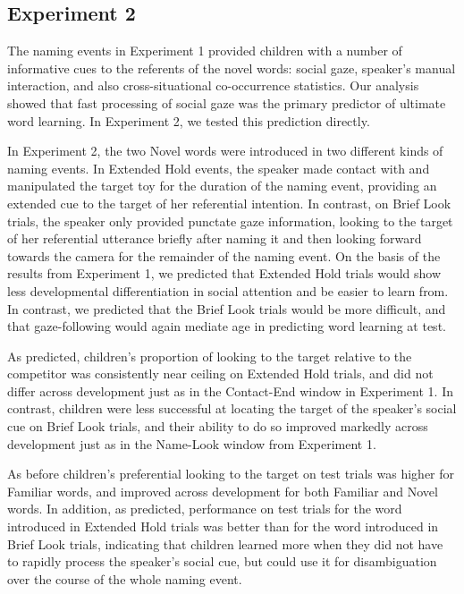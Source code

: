 \documentclass{pnastwo}
\begin{document}
\begin{article}
\section{Experiment 2}

The naming events in Experiment 1 provided children with a number of informative cues to the referents of the novel words: social gaze, speaker's manual interaction, and also cross-situational co-occurrence statistics. Our analysis showed that fast processing of social gaze was the primary predictor of ultimate word learning. In Experiment 2, we tested this prediction directly. 

In Experiment 2, the two Novel words were introduced in two different kinds of naming events. In Extended Hold events, the speaker made contact with and manipulated the target toy for the duration of the naming event, providing an extended cue to the target of her referential intention. In contrast, on Brief Look trials, the speaker only provided punctate gaze information, looking to the target of her referential utterance briefly after naming it and then looking forward towards the camera for the remainder of the naming event. On the basis of the results from Experiment 1, we predicted that Extended Hold trials would show less developmental differentiation in social attention and be easier to learn from. In contrast, we predicted that the Brief Look trials would be more difficult, and that gaze-following would again mediate age in predicting word learning at test.

As predicted, children's proportion of looking to the target relative to the competitor was consistently near ceiling on Extended Hold trials, and did not differ across development just as in the Contact-End window in Experiment 1. In contrast, children were less successful at locating the target of the speaker's social cue on Brief Look trials, and their ability to do so improved markedly across development  just as in the Name-Look window from Experiment 1. 

As before children's preferential looking to the target on test trials was higher for Familiar words, and improved across development for both Familiar and Novel words. In addition, as predicted, performance on test trials for the word introduced in Extended Hold trials was better than for the word introduced in Brief Look trials, indicating that children learned more when they did not have to rapidly process the speaker's social cue, but could use it for disambiguation over the course of the whole naming event.


\end{article}
\end{document}
